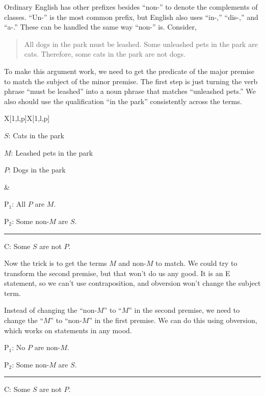 Ordinary English has other prefixes besides ``non-'' to denote the complements of classes. ``Un-'' is the most common prefix, but English also uses ``in-,'' ``dis-,'' and ``a-.'' These can be handled the same way ``non-'' is. Consider,

\begin{quotation}
All dogs in the park must be leashed. Some unleashed pets in the park are cats. Therefore, some cats in the park are not dogs.
\end{quotation}

To make this argument work, we need to get the predicate of the major premise to match the subject of the minor premise. The first step is just turning the verb phrase ``must be leashed'' into a noun phrase that matches ``unleashed pets.'' We also should use the qualification ``in the park'' consistently across the terms. 

\begin{tabu}{{X[1,l,p]X[1,l,p]}}

\begin{ekey}
\item[$S$:] Cats in the park
\item[$M$:] Leashed pets in the park
\item[$P$:] Dogs in the park 
\end{ekey}

&

\begin{earg}
\item[P$_1$:]  All $P$ are $M$.
\item[P$_2$:] Some non-$M$ are $S$.
\vspace{-.5em}
\item [] \rule{0.6\linewidth}{.5pt} 
\item[C:] Some $S$ are not $P$.
\end{earg} 

\end{tabu}

Now the trick is to get the terms $M$ and non-$M$ to match. We could try to transform the second premise, but that won't do us any good. It is an E statement, so we can't use contraposition, and obversion won't change the subject term. 

Instead of changing the ``non-$M$'' to ``$M$'' in the second premise, we need to change the ``$M$'' to ``non-$M$'' in the first premise. We can do this using obversion, which works on statements in any mood.  

\begin{earg}
\item[P$_1$:]  No $P$ are non-$M$.
\item[P$_2$:] Some non-$M$ are $S$.
\vspace{-.5em}
\item [] \rule{0.2\linewidth}{.5pt} 
\item[C:] Some $S$ are not $P$.
\end{earg} 

